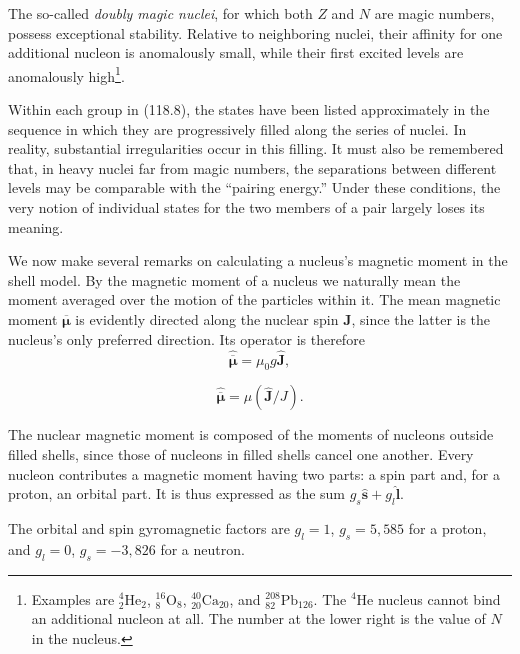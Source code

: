 The so-called \emph{doubly magic nuclei}, for which both $Z$ and $N$ are magic
numbers, possess exceptional stability. Relative to neighboring nuclei, their
affinity for one additional nucleon is anomalously small, while their first
excited levels are anomalously high\footnote{Examples are
${}^{4}_{2}\mathrm{He}_{2}$, ${}^{16}_{8}\mathrm{O}_{8}$,
${}^{40}_{20}\mathrm{Ca}_{20}$, and
${}^{208}_{82}\mathrm{Pb}_{126}$. The ${}^{4}\mathrm{He}$ nucleus cannot
bind an additional nucleon at all. The number at the lower right is the value
of $N$ in the nucleus.}.

Within each group in (118.8), the states have been listed approximately in the
sequence in which they are progressively filled along the series of nuclei.
In reality, substantial irregularities occur in this filling. It must also be
remembered that, in heavy nuclei far from magic numbers, the separations
between different levels may be comparable with the ``pairing energy.'' Under
these conditions, the very notion of individual states for the two members of
a pair largely loses its meaning.

We now make several remarks on calculating a nucleus's magnetic moment in the
shell model. By the magnetic moment of a nucleus we naturally mean the moment
averaged over the motion of the particles within it. The mean magnetic moment
$\overline{\boldsymbol\mu}$ is evidently directed along the nuclear spin
$\mathbf J$, since the latter is the nucleus's only preferred direction. Its
operator is therefore
\begin{equation}
 \hat{\overline{\boldsymbol\mu}}=\mu_0g\hat{\mathbf J},
 \tag{118.9}
\end{equation}

\begin{equation}
 \hat{\overline{\boldsymbol\mu}}=\mu(\hat{\mathbf J}/J).
 \tag{118.10}
\end{equation}

The nuclear magnetic moment is composed of the moments of nucleons outside
filled shells, since those of nucleons in filled shells cancel one another.
Every nucleon contributes a magnetic moment having two parts: a spin part and,
for a proton, an orbital part. It is thus expressed as the sum
$g_s\hat{\mathbf s}+g_l\hat{\mathbf l}$.

The orbital and spin gyromagnetic factors are
$g_l=1$, $g_s=5{,}585$ for a proton, and $g_l=0$, $g_s=-3{,}826$ for a
neutron.

